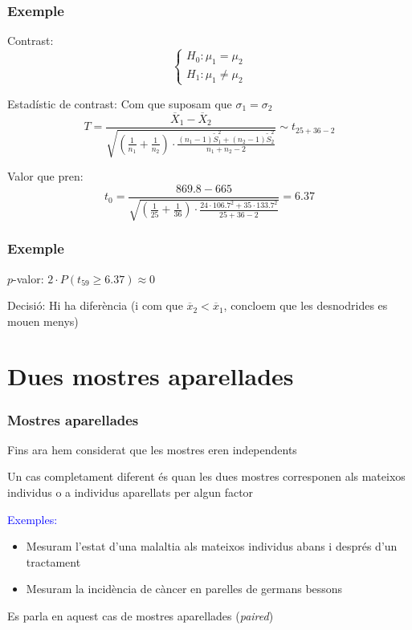 \documentclass[12pt,t]{beamer}
\newcommand{\blue}[1]{\textcolor{blue}{#1}}
\renewcommand{\emph}[1]{{\color{red}#1}}
\renewcommand{\geq}{\geqslant}
\theoremstyle{plain}
\theoremstyle{definition}
\begin{document}
\begin{frame}
\frametitle{Exemple}
\emph{Contrast}:
$$
\left\{\begin{array}{l}
H_0:\mu_1=\mu_2\\
H_1:\mu_1\neq \mu_2
\end{array}\right.
$$

\emph{Estadístic de contrast}: Com que suposam que $\sigma_1= \sigma_2$
$$
T=\frac{\overline{X}_1-\overline{X}_2}%
{\sqrt{(\frac{1}{n_1}+\frac{1}{n_2})\cdot 
\frac{(n_1-1)\widetilde{S}_1^2+(n_2-1)\widetilde{S}_2^2}%
{n_1+n_2-2}}}\sim t_{25+36-2}
$$

\medskip

\emph{Valor que pren}: 
$$
t_0=\frac{869.8-665}%
{\sqrt{(\frac{1}{25}+\frac{1}{36})\cdot 
\frac{24\cdot 106.7^2+35\cdot 133.7^2}%
{25+36-2}}}=6.37
$$
\end{frame}

\begin{frame}
\frametitle{Exemple}

\emph{$p$-valor}: 
$2\cdot P(t_{59}\geq 6.37)\approx 0$
\medskip

\emph{Decisió}: Hi ha diferència (i com que $\overline{x}_2<\overline{x}_1$, concloem que les desnodrides es mouen menys)
\end{frame}






\section{Dues mostres aparellades}

\begin{frame}
\frametitle{Mostres aparellades}

Fins ara hem considerat que les mostres eren independents
\medskip

Un cas completament diferent és quan les dues mostres corresponen als mateixos
individus o a individus aparellats per algun factor 
\medskip

\blue{Exemples:}
\begin{itemize}
\item Mesuram l'estat d'una malaltia als mateixos individus abans i després d'un tractament

\item Mesuram la incidència de càncer en parelles de germans bessons
\end{itemize}
Es parla en aquest cas de \emph{mostres aparellades} (\textsl{paired})
\end{frame}
\end{document}
